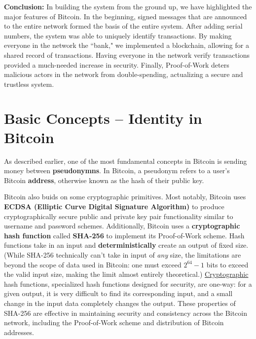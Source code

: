 \documentclass[11pt]{article}
\begin{document}
    \textbf{Conclusion:} In building the system from the ground up, we have highlighted the major features of Bitcoin. In the beginning, signed messages that are announced to the entire network formed the basis of the entire system. After adding serial numbers, the system was able to uniquely identify transactions. By making everyone in the network the ``bank," we implemented a blockchain, allowing for a shared record of transactions. Having everyone in the network verify transactions provided a much-needed increase in security. Finally, Proof-of-Work deters malicious actors in the network from double-spending, actualizing a secure and trustless system. 
    
    \section*{Basic Concepts -- Identity in Bitcoin}
    
    As described earlier, one of the most fundamental concepts in Bitcoin is sending money between \textbf{pseudonymns}. In Bitcoin, a pseudonym refers to a user's Bitcoin \textbf{address}, otherwise known as the hash of their public key.
    
    Bitcoin also buids on some cryptographic primitives. Most notably, Bitcoin uses \textbf{ECDSA (Elliptic Curve Digital Signature Algorithm)} to produce cryptographically secure public and private key pair functionality similar to username and password schemes. Additionally, Bitcoin uses a \textbf{cryptographic hash function} called \textbf{SHA-256} to implement its Proof-of-Work scheme. Hash functions take in an input and \textbf{deterministically} create an output of fixed size. (While SHA-256 technically can't take in input of \textit{any} size, the limitations are beyond the scope of data used in Bitcoin: one must exceed $2^{64} - 1$ bits to exceed the valid input size, making the limit almost entirely theoretical.) \underline{Cryptographic} hash functions, specialized hash functions designed for security, are one-way: for a given output, it is very difficult to find its corresponding input, and a small change in the input data completely changes the output. These properties of SHA-256 are effective in maintaining security and consistency across the Bitcoin network, including the Proof-of-Work scheme and distribution of Bitcoin addresses.
    
\end{document}
